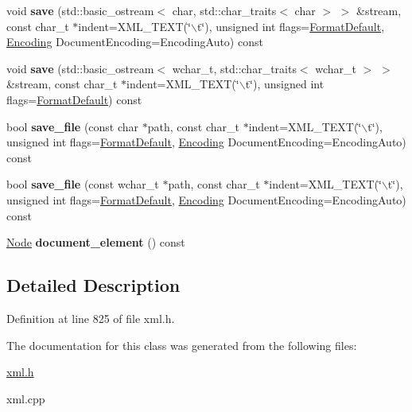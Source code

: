 \begin{DoxyCompactItemize}
\item 
\hypertarget{classphys_1_1xml_1_1Document_a7b59dab683101ad4374b8b9009dbec4a}{
void {\bfseries save} (std::basic\_\-ostream$<$ char, std::char\_\-traits$<$ char $>$ $>$ \&stream, const char\_\-t $\ast$indent=XML\_\-TEXT(\char`\"{}$\backslash$t\char`\"{}), unsigned int flags=\hyperlink{namespacephys_1_1xml_a08bf6aab51f79929d9097706a5e64408}{FormatDefault}, \hyperlink{namespacephys_1_1xml_a420f5de782438f88160321385bea2015}{Encoding} DocumentEncoding=EncodingAuto) const }
\label{dd/d44/classphys_1_1xml_1_1Document_a7b59dab683101ad4374b8b9009dbec4a}

\item 
\hypertarget{classphys_1_1xml_1_1Document_ab0b68aaf634ec540815f6ea99da15d58}{
void {\bfseries save} (std::basic\_\-ostream$<$ wchar\_\-t, std::char\_\-traits$<$ wchar\_\-t $>$ $>$ \&stream, const char\_\-t $\ast$indent=XML\_\-TEXT(\char`\"{}$\backslash$t\char`\"{}), unsigned int flags=\hyperlink{namespacephys_1_1xml_a08bf6aab51f79929d9097706a5e64408}{FormatDefault}) const }
\label{dd/d44/classphys_1_1xml_1_1Document_ab0b68aaf634ec540815f6ea99da15d58}

\item 
\hypertarget{classphys_1_1xml_1_1Document_a733a41e829fb573c649b214125b33445}{
bool {\bfseries save\_\-file} (const char $\ast$path, const char\_\-t $\ast$indent=XML\_\-TEXT(\char`\"{}$\backslash$t\char`\"{}), unsigned int flags=\hyperlink{namespacephys_1_1xml_a08bf6aab51f79929d9097706a5e64408}{FormatDefault}, \hyperlink{namespacephys_1_1xml_a420f5de782438f88160321385bea2015}{Encoding} DocumentEncoding=EncodingAuto) const }
\label{dd/d44/classphys_1_1xml_1_1Document_a733a41e829fb573c649b214125b33445}

\item 
\hypertarget{classphys_1_1xml_1_1Document_a7eff3072bf3e87b40b1d6906eb5baf17}{
bool {\bfseries save\_\-file} (const wchar\_\-t $\ast$path, const char\_\-t $\ast$indent=XML\_\-TEXT(\char`\"{}$\backslash$t\char`\"{}), unsigned int flags=\hyperlink{namespacephys_1_1xml_a08bf6aab51f79929d9097706a5e64408}{FormatDefault}, \hyperlink{namespacephys_1_1xml_a420f5de782438f88160321385bea2015}{Encoding} DocumentEncoding=EncodingAuto) const }
\label{dd/d44/classphys_1_1xml_1_1Document_a7eff3072bf3e87b40b1d6906eb5baf17}

\item 
\hypertarget{classphys_1_1xml_1_1Document_a481cbf277cfe6d6daf1b66f8d862b88e}{
\hyperlink{classphys_1_1xml_1_1Node}{Node} {\bfseries document\_\-element} () const }
\label{dd/d44/classphys_1_1xml_1_1Document_a481cbf277cfe6d6daf1b66f8d862b88e}

\end{DoxyCompactItemize}


\subsection{Detailed Description}


Definition at line 825 of file xml.h.



The documentation for this class was generated from the following files:\begin{DoxyCompactItemize}
\item 
\hyperlink{xml_8h}{xml.h}\item 
xml.cpp\end{DoxyCompactItemize}
